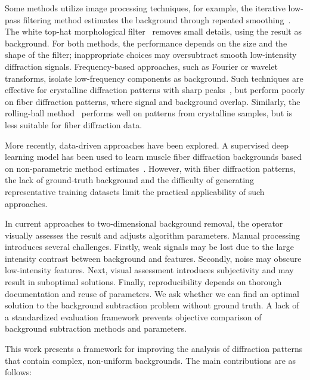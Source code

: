 \documentclass[journal,article,submit,moreauthors]{Definitions/mdpi}
\begin{document}
Some methods utilize image processing techniques, for example, the iterative low-pass filtering method estimates the background through repeated smoothing~\citep{IvanovaMakowski1998}. The white top-hat morphological filter~\citep{GonzalezWoodsDIP4e} removes small details, using the result as background. For both methods, the performance depends on the size and the shape of the filter; inappropriate choices may oversubtract smooth low-intensity diffraction signals. Frequency-based approaches, such as Fourier or wavelet transforms, isolate low-frequency components as background. Such techniques are effective for crystalline diffraction patterns with sharp peaks~\citep{PolarBackground2024, WaveletBiomedOptExpress2021, renedecotret2017baseline}, but perform poorly on fiber diffraction patterns, where signal and background overlap. Similarly, the rolling-ball method~\citep{Sternberg1983} performs well on patterns from crystalline samples, but is less suitable for fiber diffraction data.

More recently, data-driven approaches have been explored. A supervised deep learning model has been used to learn muscle fiber diffraction backgrounds based on non-parametric method estimates~\citep{ArangurenCarmona2020}. However, with fiber diffraction patterns, the lack of ground-truth background and the difficulty of generating representative training datasets limit the practical applicability of such approaches.

In current approaches to two-dimensional background removal, the operator visually assesses the result and adjusts algorithm parameters. Manual processing introduces several challenges. Firstly, weak signals may be lost due to the large intensity contrast between background and features. Secondly, noise may obscure low-intensity features. Next, visual assessment introduces subjectivity and may result in suboptimal solutions. Finally, reproducibility depends on thorough documentation and reuse of parameters. We ask whether we can find an optimal solution to the background subtraction problem without ground truth. A lack of a standardized evaluation framework prevents objective comparison of background subtraction methods and parameters.

This work presents a framework for improving the analysis of diffraction patterns that contain complex, non-uniform backgrounds. The main contributions are as follows:
\end{document}
